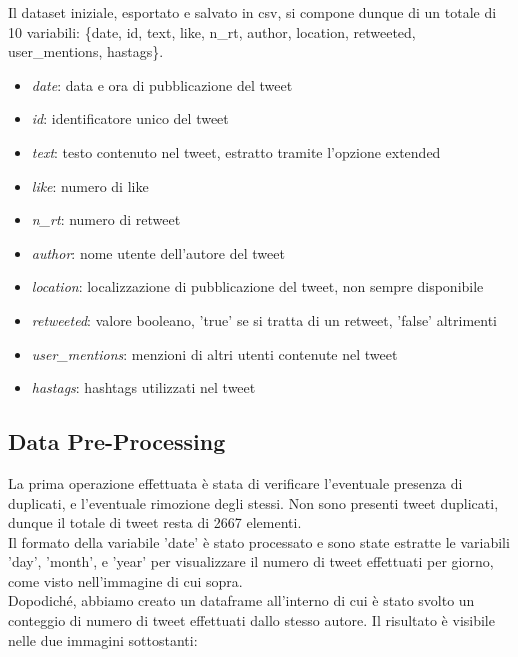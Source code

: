 \documentclass[12pt,journal,compsoc]{IEEEtran}
\begin{document}
Il dataset iniziale, esportato e salvato in csv, si compone dunque di un totale di 10 variabili: \{date, id, text, like, n\_rt, author, location, retweeted, user\_mentions, hastags\}.

\begin{itemize}
	\item \textit{date}: data e ora di pubblicazione del tweet
	\item \textit{id}: identificatore unico del tweet
	\item \textit{text}: testo contenuto nel tweet, estratto tramite l'opzione extended
	\item \textit{like}: numero di like
	\item \textit{n\_rt}: numero di retweet
	\item \textit{author}: nome utente dell'autore del tweet
	\item \textit{location}: localizzazione di pubblicazione del tweet, non sempre disponibile
	\item \textit{retweeted}: valore booleano, 'true' se si tratta di un retweet, 'false' altrimenti
	\item \textit{user\_mentions}: menzioni di altri utenti contenute nel tweet
	\item \textit{hastags}: hashtags utilizzati nel tweet
\end{itemize}

\subsection{Data Pre-Processing}
La prima operazione effettuata è stata di verificare l'eventuale presenza di duplicati, e l'eventuale rimozione degli stessi. Non sono presenti tweet duplicati, dunque il totale di tweet resta di 2667 elementi.\\
Il formato della variabile 'date' è stato processato e sono state estratte le variabili 'day', 'month', e 'year' per visualizzare il numero di tweet effettuati per giorno, come visto nell'immagine di cui sopra.\\
Dopodiché, abbiamo creato un dataframe all'interno di cui è stato svolto un conteggio di numero di tweet effettuati dallo stesso autore. Il risultato è visibile nelle due immagini sottostanti:
\end{document}
